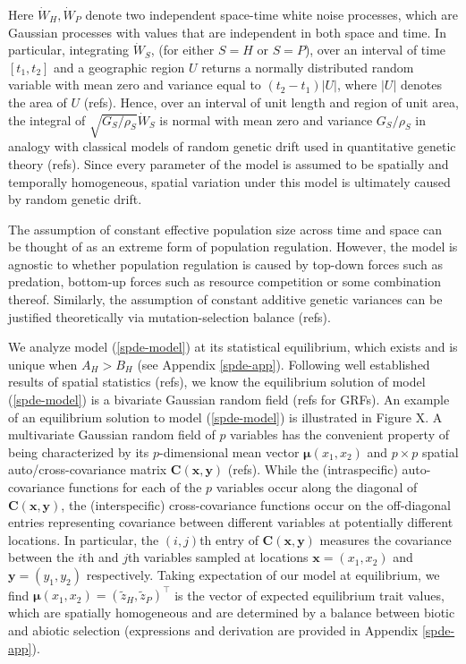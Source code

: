 \documentclass{article}
\begin{document}
Here \(\dot W_H,\dot W_P\) denote two independent space-time white noise
processes, which are Gaussian processes with values that are independent
in both space and time. In particular, integrating \(\dot W_S\), (for
either \(S=H\) or \(S=P\)), over an interval of time \([t_1,t_2]\) and a
geographic region \(U\) returns a normally distributed random variable
with mean zero and variance equal to \((t_2-t_1)|U|\), where \(|U|\)
denotes the area of \(U\) (refs). Hence, over an interval of unit length
and region of unit area, the integral of \(\sqrt{G_S/\rho_S}\dot W_S\)
is normal with mean zero and variance \(G_S/\rho_S\) in analogy with
classical models of random genetic drift used in quantitative genetic
theory (refs). Since every parameter of the model is assumed to be
spatially and temporally homogeneous, spatial variation under this model
is ultimately caused by random genetic drift.

The assumption of constant effective population size across time and
space can be thought of as an extreme form of population regulation.
However, the model is agnostic to whether population regulation is
caused by top-down forces such as predation, bottom-up forces such as
resource competition or some combination thereof. Similarly, the
assumption of constant additive genetic variances can be justified
theoretically via mutation-selection balance (refs).

We analyze model (\ref{spde-model}) at its statistical equilibrium,
which exists and is unique when \(A_H>B_H\) (see Appendix
\ref{spde-app}). Following well established results of spatial
statistics (refs), we know the equilibrium solution of model
(\ref{spde-model}) is a bivariate Gaussian random field (refs for GRFs).
An example of an equilibrium solution to model (\ref{spde-model}) is
illustrated in Figure X. A multivariate Gaussian random field of \(p\)
variables has the convenient property of being characterized by its
\(p\)-dimensional mean vector \(\pmb \mu(x_1,x_2)\) and \(p\times p\)
spatial auto/cross-covariance matrix \(\pmb C(\pmb x,\pmb y)\) (refs).
While the (intraspecific) auto-covariance functions for each of the
\(p\) variables occur along the diagonal of \(\pmb C(\pmb x,\pmb y)\),
the (interspecific) cross-covariance functions occur on the off-diagonal
entries representing covariance between different variables at
potentially different locations. In particular, the \((i,j)\)th entry of
\(\pmb C(\pmb x,\pmb y)\) measures the covariance between the \(i\)th
and \(j\)th variables sampled at locations \(\pmb x=(x_1,x_2)\) and
\(\pmb y=(y_1,y_2)\) respectively. Taking expectation of our model at
equilibrium, we find \(\pmb\mu(x_1,x_2)=(\tilde z_H,\tilde z_P)^\top\)
is the vector of expected equilibrium trait values, which are spatially
homogeneous and are determined by a balance between biotic and abiotic
selection (expressions and derivation are provided in Appendix
\ref{spde-app}).
\end{document}
